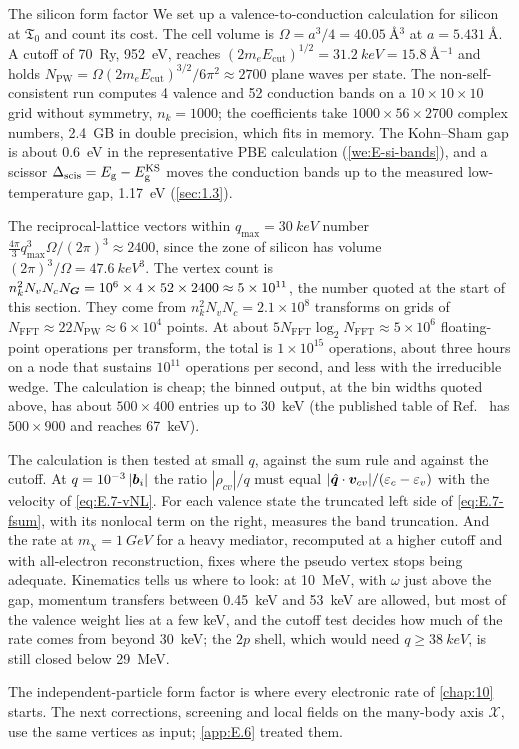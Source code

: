\begin{workedexample}{The silicon form factor}\label{we:E-siff}
We set up a valence-to-conduction calculation for silicon at $\mathfrak{T}_0$ and count its cost. The cell volume is $\Omega = a^3/4 = \SI{40.05}{\angstrom^3}$ at $a = \SI{5.431}{\angstrom}$. A cutoff of \SI{70}{Ry}, \SI{952}{eV}, reaches $(2m_eE_{\mathrm{cut}})^{1/2} = \SI{31.2}{keV} = \SI{15.8}{\angstrom^{-1}}$ and holds $N_{\mathrm{PW}} = \Omega(2m_eE_{\mathrm{cut}})^{3/2}/6\pi^2 \approx 2700$ plane waves per state. The non-self-consistent run computes 4 valence and 52 conduction bands on a $10\times10\times10$ grid without symmetry, $n_k = 1000$; the coefficients take $1000\times56\times2700$ complex numbers, \SI{2.4}{GB} in double precision, which fits in memory. The Kohn--Sham gap is about \SI{0.6}{eV} in the representative PBE calculation (\cref{we:E-si-bands}), and a scissor $\Delta_{\mathrm{scis}} = E_{\mathrm{g}} - E_{\mathrm{g}}^{\mathrm{KS}}$ moves the conduction bands up to the measured low-temperature gap, \SI{1.17}{eV} (\cref{sec:1.3}).

The reciprocal-lattice vectors within $q_{\mathrm{max}} = \SI{30}{keV}$ number $\frac{4\pi}{3}q_{\mathrm{max}}^3\Omega/(2\pi)^3 \approx 2400$, since the zone of silicon has volume $(2\pi)^3/\Omega = \SI{47.6}{keV^3}$. The vertex count is $n_k^2N_vN_cN_{\bm{G}} = 10^6\times4\times52\times2400 \approx 5\times10^{11}$, the number quoted at the start of this section. They come from $n_k^2N_vN_c = 2.1\times10^8$ transforms on grids of $N_{\mathrm{FFT}} \approx 22N_{\mathrm{PW}} \approx 6\times10^4$ points. At about $5N_{\mathrm{FFT}}\log_2N_{\mathrm{FFT}} \approx 5\times10^6$ floating-point operations per transform, the total is $1\times10^{15}$ operations, about three hours on a node that sustains $10^{11}$ operations per second, and less with the irreducible wedge. The calculation is cheap; the binned output, at the bin widths quoted above, has about $500\times400$ entries up to \SI{30}{keV} (the published table of Ref.~\cite{essig2016direct} has $500\times900$ and reaches \SI{67}{keV}).

The calculation is then tested at small $q$, against the sum rule and against the cutoff. At $q = 10^{-3}\,|\bm{b}_i|$ the ratio $|\rho_{cv}|/q$ must equal $|\hat{\bm{q}}\cdot\bm{v}_{cv}|/(\varepsilon_c - \varepsilon_v)$ with the velocity of \cref{eq:E.7-vNL}. For each valence state the truncated left side of \cref{eq:E.7-fsum}, with its nonlocal term on the right, measures the band truncation. And the rate at $m_\chi = \SI{1}{GeV}$ for a heavy mediator, recomputed at a higher cutoff and with all-electron reconstruction, fixes where the pseudo vertex stops being adequate. Kinematics tells us where to look: at \SI{10}{MeV}, with $\omega$ just above the gap, momentum transfers between \SI{0.45}{keV} and \SI{53}{keV} are allowed, but most of the valence weight lies at a few keV, and the cutoff test decides how much of the rate comes from beyond \SI{30}{keV}; the $2p$ shell, which would need $q \ge \SI{38}{keV}$, is still closed below \SI{29}{MeV}.
\end{workedexample}

The independent-particle form factor is where every electronic rate of \cref{chap:10} starts. The next corrections, screening and local fields on the many-body axis $\mathcal{X}$, use the same vertices as input; \cref{app:E.6} treated them.
